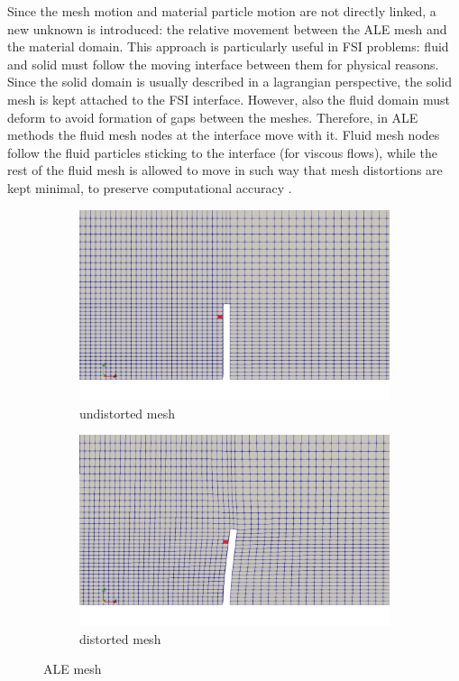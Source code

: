 Since the mesh motion and material particle motion are not directly linked, a new unknown is introduced:  the relative movement between the ALE mesh and the material domain. This approach is particularly useful in FSI problems: fluid and solid must follow the moving interface between them for physical reasons.
Since the solid domain is usually described in a lagrangian perspective, the solid mesh is kept attached to the FSI interface. However, also the fluid domain must deform to avoid formation of gaps between the meshes. Therefore, in ALE methods the fluid mesh nodes at the interface move with it. Fluid mesh nodes follow the fluid particles sticking to the interface (for viscous flows), while the rest of the fluid mesh is allowed to move in such way that mesh distortions are kept minimal, to preserve computational accuracy \cite{ramm1998fluid}.

\begin{figure}[htbp!]
	\centering
	\begin{subfigure}{.5\textwidth}
		\centering
		\includegraphics[width=.99\linewidth]{images/undist}
		\caption{undistorted mesh}
		\label{fig:undist}
	\end{subfigure}%
	\begin{subfigure}{.5\textwidth}
		\centering
		\includegraphics[width=.99\linewidth]{images/dist}
		\caption{distorted mesh}
		\label{fig:dist}
	\end{subfigure}
	\caption{ALE mesh}
	\label{fig:ale-mesh}
\end{figure}


